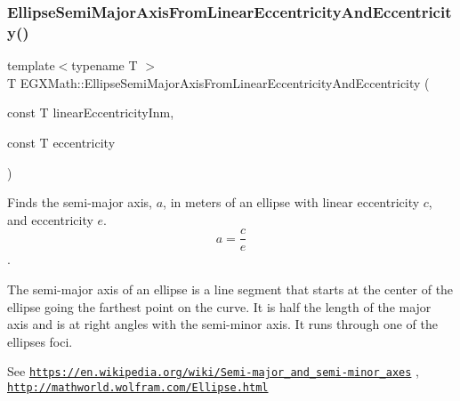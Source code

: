 \mbox{\label{group___e_g_x_math-_geometry-2_d-_ellipse-_semi_major_axis_gaf013b5a5e305696948669e348c7dd1c1}} 
\subsubsection{\texorpdfstring{Ellipse\+Semi\+Major\+Axis\+From\+Linear\+Eccentricity\+And\+Eccentricity()}{EllipseSemiMajorAxisFromLinearEccentricityAndEccentricity()}}
{\footnotesize\ttfamily template$<$typename T $>$ \\
T E\+G\+X\+Math\+::\+Ellipse\+Semi\+Major\+Axis\+From\+Linear\+Eccentricity\+And\+Eccentricity (\begin{DoxyParamCaption}\item[{const T}]{linear\+Eccentricity\+Inm,  }\item[{const T}]{eccentricity }\end{DoxyParamCaption})}



Finds the semi-\/major axis, $a$, in meters of an ellipse with linear eccentricity $c$, and eccentricity $e$. \[ a=\dfrac{c}{e} \]. 

The semi-\/major axis of an ellipse is a line segment that starts at the center of the ellipse going the farthest point on the curve. It is half the length of the major axis and is at right angles with the semi-\/minor axis. It runs through one of the ellipses foci.

See \href{https://en.wikipedia.org/wiki/Semi-major_and_semi-minor_axes}{\tt https\+://en.\+wikipedia.\+org/wiki/\+Semi-\/major\+\_\+and\+\_\+semi-\/minor\+\_\+axes} , \href{http://mathworld.wolfram.com/Ellipse.html}{\tt http\+://mathworld.\+wolfram.\+com/\+Ellipse.\+html}



